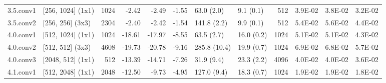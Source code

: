 \begin{table}
\begin{tabular}{llrrrrllrrrr}
3.5.conv1 & [256, 1024] (1x1) & 1024 & {\cellcolor[HTML]{FFFDBC}} \color[HTML]{000000} -2.42 & {\cellcolor[HTML]{FFFCBA}} \color[HTML]{000000} -2.49 & {\cellcolor[HTML]{F8FCB6}} \color[HTML]{000000} -1.55 & 63.0 (2.0) & 9.1 (0.1) & 512 & {\cellcolor[HTML]{FDBB6C}} \color[HTML]{000000} 3.9E-02 & {\cellcolor[HTML]{FDC171}} \color[HTML]{000000} 3.8E-02 & {\cellcolor[HTML]{FEE18D}} \color[HTML]{000000} 3.2E-02 \\
3.5.conv2 & [256, 256] (3x3) & 2304 & {\cellcolor[HTML]{FFFDBC}} \color[HTML]{000000} -2.40 & {\cellcolor[HTML]{FFFDBC}} \color[HTML]{000000} -2.42 & {\cellcolor[HTML]{F8FCB6}} \color[HTML]{000000} -1.54 & 141.8 (2.2) & 9.9 (0.1) & 512 & {\cellcolor[HTML]{E75337}} \color[HTML]{F1F1F1} 5.4E-02 & {\cellcolor[HTML]{E24731}} \color[HTML]{F1F1F1} 5.6E-02 & {\cellcolor[HTML]{FB9D59}} \color[HTML]{000000} 4.4E-02 \\
4.0.conv1 & [512, 1024] (1x1) & 1024 & {\cellcolor[HTML]{C01A27}} \color[HTML]{F1F1F1} -18.61 & {\cellcolor[HTML]{CA2427}} \color[HTML]{F1F1F1} -17.97 & {\cellcolor[HTML]{FDBD6D}} \color[HTML]{000000} -8.55 & 63.5 (2.7) & 16.0 (0.2) & 1024 & {\cellcolor[HTML]{F36B42}} \color[HTML]{F1F1F1} 5.1E-02 & {\cellcolor[HTML]{F36B42}} \color[HTML]{F1F1F1} 5.1E-02 & {\cellcolor[HTML]{FBA05B}} \color[HTML]{000000} 4.3E-02 \\
4.0.conv2 & [512, 512] (3x3) & 4608 & {\cellcolor[HTML]{B30D26}} \color[HTML]{F1F1F1} -19.73 & {\cellcolor[HTML]{A50026}} \color[HTML]{F1F1F1} -20.78 & {\cellcolor[HTML]{FDB365}} \color[HTML]{000000} -9.16 & 285.8 (10.4) & 19.9 (0.7) & 1024 & {\cellcolor[HTML]{A50026}} \color[HTML]{F1F1F1} 6.9E-02 & {\cellcolor[HTML]{A50026}} \color[HTML]{F1F1F1} 6.8E-02 & {\cellcolor[HTML]{DE402E}} \color[HTML]{F1F1F1} 5.7E-02 \\
4.0.conv3 & [2048, 512] (1x1) & 512 & {\cellcolor[HTML]{F36B42}} \color[HTML]{F1F1F1} -13.39 & {\cellcolor[HTML]{E95538}} \color[HTML]{F1F1F1} -14.71 & {\cellcolor[HTML]{FECC7B}} \color[HTML]{000000} -7.26 & 31.9 (9.4) & 23.3 (2.2) & 4096 & {\cellcolor[HTML]{FDB567}} \color[HTML]{000000} 4.0E-02 & {\cellcolor[HTML]{FDB567}} \color[HTML]{000000} 4.0E-02 & {\cellcolor[HTML]{FECC7B}} \color[HTML]{000000} 3.6E-02 \\
4.1.conv1 & [512, 2048] (1x1) & 2048 & {\cellcolor[HTML]{F67A49}} \color[HTML]{F1F1F1} -12.50 & {\cellcolor[HTML]{FCAA5F}} \color[HTML]{000000} -9.73 & {\cellcolor[HTML]{FEE797}} \color[HTML]{000000} -4.95 & 127.0 (9.4) & 18.3 (0.7) & 1024 & {\cellcolor[HTML]{EBF7A3}} \color[HTML]{000000} 1.9E-02 & {\cellcolor[HTML]{EBF7A3}} \color[HTML]{000000} 1.9E-02 & {\cellcolor[HTML]{E8F59F}} \color[HTML]{000000} 1.8E-02 \\

\end{tabular}
\end{table}
